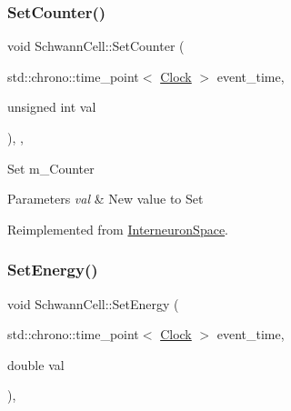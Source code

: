 \mbox{\label{classSchwannCell_a067f87983cb937d5fdb882c267e27921}} 
\subsubsection{\texorpdfstring{Set\+Counter()}{SetCounter()}}
{\footnotesize\ttfamily void Schwann\+Cell\+::\+Set\+Counter (\begin{DoxyParamCaption}\item[{std\+::chrono\+::time\+\_\+point$<$ \mbox{\hyperlink{universe_8h_a0ef8d951d1ca5ab3cfaf7ab4c7a6fd80}{Clock}} $>$}]{event\+\_\+time,  }\item[{unsigned int}]{val }\end{DoxyParamCaption})\hspace{0.3cm}{\ttfamily [inline]}, {\ttfamily [private]}, {\ttfamily [virtual]}}

Set m\+\_\+\+Counter 
\begin{DoxyParams}{Parameters}
{\em val} & New value to Set \\
\hline
\end{DoxyParams}


Reimplemented from \mbox{\hyperlink{classInterneuronSpace_a60a46f22a2e575d65031635a698a60a9}{Interneuron\+Space}}.

\mbox{\label{classSchwannCell_aadc0a342e29ccacbd8686b9431fb41c6}} 
\subsubsection{\texorpdfstring{Set\+Energy()}{SetEnergy()}}
{\footnotesize\ttfamily void Schwann\+Cell\+::\+Set\+Energy (\begin{DoxyParamCaption}\item[{std\+::chrono\+::time\+\_\+point$<$ \mbox{\hyperlink{universe_8h_a0ef8d951d1ca5ab3cfaf7ab4c7a6fd80}{Clock}} $>$}]{event\+\_\+time,  }\item[{double}]{val }\end{DoxyParamCaption})\hspace{0.3cm}{\ttfamily [inline]}, {\ttfamily [private]}}

\mbox{\label{classSchwannCell_a765280afc21c2546ad6162db46089d40}} 
